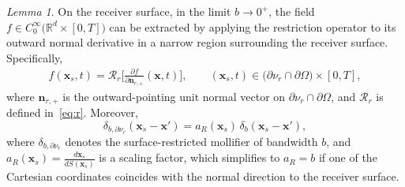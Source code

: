 \documentclass[11pt,reqno]{amsart}
\theoremstyle{remark}
\theoremstyle{italic_lemma}
\newtheorem{lemma}{Lemma}
\newcommand{\bx}{\boldsymbol{x}}
\newcommand{\bn}{\boldsymbol{n}}
\begin{document}
\begin{lemma} \label{lemma:extraction}
On the receiver surface, in the limit $b \to 0^+$, the field $f \in C_0^{\infty}\big(\mathbb{R}^d \times [0,T]\big)$ can be extracted by applying the restriction operator to its outward normal derivative in a narrow region surrounding the receiver surface. Specifically,
\begin{align}
    f(\bx_s, t)
    = \mathcal{R}_r \Big[ \frac{\partial f}{\partial \bn_{r,+}} (\bx, t) \Big],
    \qquad
    (\bx_s, t) \in \big(\partial \nu_r \cap \partial \Omega\big) \times [0,T],
\end{align}
where $\bn_{r,+}$ is the outward-pointing unit normal vector on $\partial \nu_r \cap \partial \Omega$, and $\mathcal{R}_r$ is defined in~\eqref{eq:r}. Moreover,
\[
    \delta_{b,\partial \nu_r}(\bx_s - \bx')
    = a_R(\bx_s) \, \delta_b(\bx_s - \bx'),
\]
where \( \delta_{b,\partial \nu_r} \) denotes the surface-restricted mollifier of bandwidth \( b \), and \( a_R(\bx_s) = \frac{d \bx_s}{dS(\bx_s)} \) is a scaling factor, which simplifies to \( a_R = b \) if one of the Cartesian coordinates coincides with the normal direction to the receiver surface.

\end{lemma}
\end{document}
